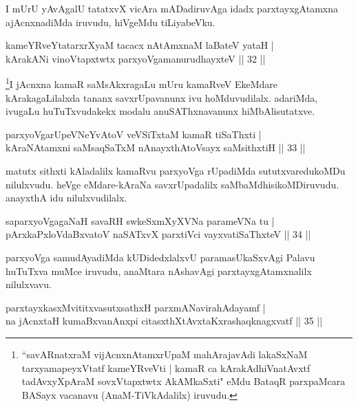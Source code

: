 \begin{artha}
I mUrU yAvAgalU tatatxvX vicAra mADadiruvAga idadx parxtayxgAtamxna ajAcnxnadiMda iruvudu, hiVgeMdu tiLiyabeVku. 
\end{artha}


\begin{shl}
kameYRveYtatarxrXyaM tacacx nA\s \s tAmxnaM laBateV yataH |\\
kArakANi vinoVtapxtwtx parxyoVgamanurudhayxteV \hfill || 32 ||
\end{shl}

\begin{artha}
\footnote[1]{``savARnatxraM vijAcnxnAtamxrUpaM mahArajavAdi lakaSxNaM tarxyamapeyxVtatf kameYRveVti | kamaR ca kArakAdhiVnatAvxtf tadAvxyXpAraM sovxVtapxtwtx AkAMkaSxti" eMdu BataqR parxpaMcara BASayx vacanavu (AnaM-TiVkAdalilx) iruvudu.}I jAcnxna kamaR saMsAkxragaLu mUru kamaRveV EkeMdare kArakagaLilalxda tananx savxrUpavanunx ivu hoMduvudilalx. adariMda, ivugaLu huTuTxvudakekx modalu anuSAThxnavanunx hiMbAlisutatxve.
\end{artha}

\begin{shl}
parxyoVgarUpeVNeYvAtoV veVSiTxtaM kamaR tiSaThxti |\\
kAraNAtamxni saMsaqSaTxM nAnayxthA\s toV\s sayx saMsithxtiH \hfill || 33 ||
\end{shl}

\begin{artha}%
matutx sithxti kAladalilx kamaRvu parxyoVga rUpadiMda sututxvaredukoMDu nilulxvudu. heVge eMdare-kAraNa savxrUpadalilx saMbaMdhisikoMDiruvudu. anayxthA idu nilulxvudilalx.
\end{artha}

\begin{shl}
saparxyoVgagaNaH savaRH swkeSxmXyXVNa parameVNa tu |\\
pArxkaPxloVdaBxvatoV naSATxvX parxtiVci vayxvatiSaThxteV \hfill || 34 ||
\end{shl}

\begin{artha}
parxyoVga samudAyadiMda kUDidedxlalxvU paramasUkaSxvAgi Palavu huTuTxva muMce iruvudu, anaMtara nAshavAgi parxtayxgAtamxnalilx nilulxvavu.
\end{artha}

\begin{shl}
parxtayxkasxMvititxvasutxsathxH parxmANavirahAdayamf |\\
na jAcnxtaH kumaBxvanAnxpi citasxthXtAvxtaKxrashaqknagxvatf \hfill || 35 ||
\end{shl}

